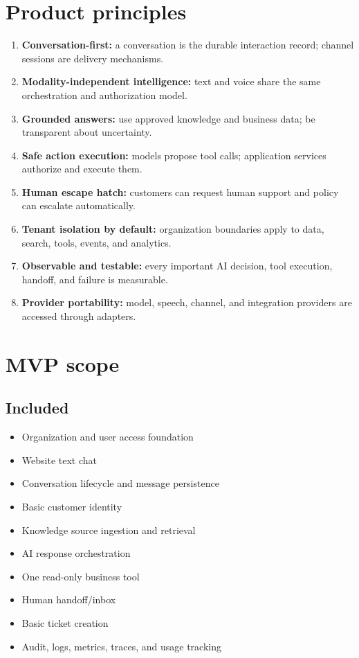 \section{Product principles}

\begin{enumerate}
\item \textbf{Conversation-first:} a conversation is the durable interaction record; channel sessions are delivery mechanisms.
\item \textbf{Modality-independent intelligence:} text and voice share the same orchestration and authorization model.
\item \textbf{Grounded answers:} use approved knowledge and business data; be transparent about uncertainty.
\item \textbf{Safe action execution:} models propose tool calls; application services authorize and execute them.
\item \textbf{Human escape hatch:} customers can request human support and policy can escalate automatically.
\item \textbf{Tenant isolation by default:} organization boundaries apply to data, search, tools, events, and analytics.
\item \textbf{Observable and testable:} every important AI decision, tool execution, handoff, and failure is measurable.
\item \textbf{Provider portability:} model, speech, channel, and integration providers are accessed through adapters.
\end{enumerate}
\section{MVP scope}

\subsection{Included}

\begin{itemize}
\item Organization and user access foundation
\item Website text chat
\item Conversation lifecycle and message persistence
\item Basic customer identity
\item Knowledge source ingestion and retrieval
\item AI response orchestration
\item One read-only business tool
\item Human handoff/inbox
\item Basic ticket creation
\item Audit, logs, metrics, traces, and usage tracking
\end{itemize}
